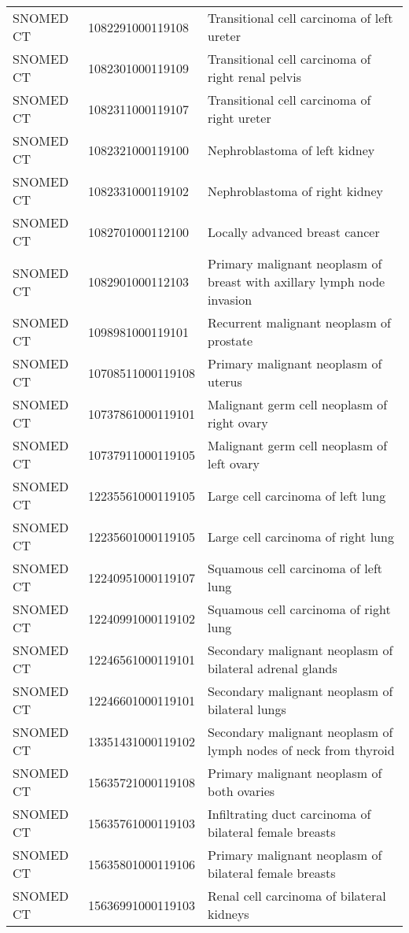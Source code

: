 \begin{longtable}{p{}p{}p{}}
  SNOMED CT & 1082291000119108 & Transitional cell carcinoma of left ureter \\ 
  SNOMED CT & 1082301000119109 & Transitional cell carcinoma of right renal pelvis \\ 
  SNOMED CT & 1082311000119107 & Transitional cell carcinoma of right ureter \\ 
  SNOMED CT & 1082321000119100 & Nephroblastoma of left kidney \\ 
  SNOMED CT & 1082331000119102 & Nephroblastoma of right kidney \\ 
  SNOMED CT & 1082701000112100 & Locally advanced breast cancer \\ 
  SNOMED CT & 1082901000112103 & Primary malignant neoplasm of breast with axillary lymph node invasion \\ 
  SNOMED CT & 1098981000119101 & Recurrent malignant neoplasm of prostate \\ 
  SNOMED CT & 10708511000119108 & Primary malignant neoplasm of uterus \\ 
  SNOMED CT & 10737861000119101 & Malignant germ cell neoplasm of right ovary \\ 
  SNOMED CT & 10737911000119105 & Malignant germ cell neoplasm of left ovary \\ 
  SNOMED CT & 12235561000119105 & Large cell carcinoma of left lung \\ 
  SNOMED CT & 12235601000119105 & Large cell carcinoma of right lung \\ 
  SNOMED CT & 12240951000119107 & Squamous cell carcinoma of left lung \\ 
  SNOMED CT & 12240991000119102 & Squamous cell carcinoma of right lung \\ 
  SNOMED CT & 12246561000119101 & Secondary malignant neoplasm of bilateral adrenal glands \\ 
  SNOMED CT & 12246601000119101 & Secondary malignant neoplasm of bilateral lungs \\ 
  SNOMED CT & 13351431000119102 & Secondary malignant neoplasm of lymph nodes of neck from thyroid \\ 
  SNOMED CT & 15635721000119108 & Primary malignant neoplasm of both ovaries \\ 
  SNOMED CT & 15635761000119103 & Infiltrating duct carcinoma of bilateral female breasts \\ 
  SNOMED CT & 15635801000119106 & Primary malignant neoplasm of bilateral female breasts \\ 
  SNOMED CT & 15636991000119103 & Renal cell carcinoma of bilateral kidneys \\ 

\end{longtable}
